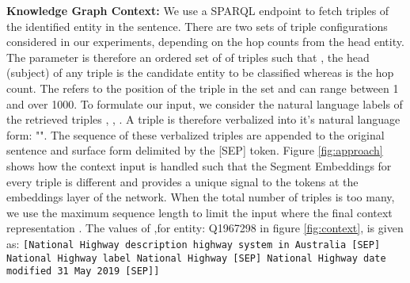 \documentclass[sigconf, superscriptaddress]{acmart}
\begin{document}
\textbf{Knowledge Graph Context: }We use a SPARQL endpoint to fetch triples of the identified entity in the sentence. There are two sets of triple configurations considered in our experiments, depending on the hop counts from the head entity. The parameter  is therefore an ordered set of of triples  such that , the head (subject) of any triple is the candidate entity to be classified whereas  is the hop count. The  refers to the position of the triple in the set and can range between 1 and over 1000. To formulate our input, we consider the natural language labels of the retrieved triples  ,  , . A triple is therefore verbalized into it's natural language form: "". The sequence of these verbalized triples are appended to the original sentence and surface form delimited by the [SEP] token. Figure \ref{fig:approach} shows how the context input is handled such that the Segment Embeddings for every triple is different and provides a unique signal to the tokens at the embeddings layer of the network.  When the total number of triples is too many, we use the maximum sequence length to limit the input where the final context representation . The values of ,for entity: Q1967298 in figure \ref{fig:context}, is given as: 
\texttt{\footnotesize{[National Highway description highway system in Australia [SEP] 
National Highway label National Highway [SEP] National Highway date modified 31 May 2019 [SEP]]}}
\end{document}
